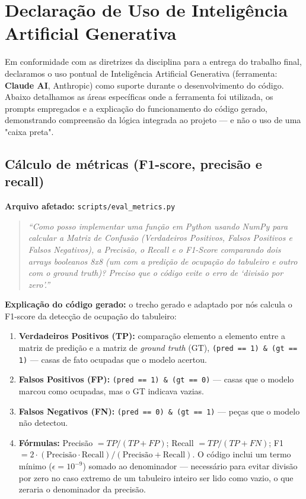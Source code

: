 \section{Declaração de Uso de Inteligência Artificial Generativa}
\label{sec:declaracao-ia}

Em conformidade com as diretrizes da disciplina para a entrega do trabalho final,
declaramos o uso pontual de Inteligência Artificial Generativa (ferramenta:
\textbf{Claude AI}, Anthropic) como suporte durante o desenvolvimento do código.
Abaixo detalhamos as áreas específicas onde a ferramenta foi utilizada, os prompts
empregados e a explicação do funcionamento do código gerado, demonstrando compreensão
da lógica integrada ao projeto --- e não o uso de uma "caixa preta".

\subsection{Cálculo de métricas (F1-score, precisão e recall)}
\label{sec:declaracao-ia-metricas}

\textbf{Arquivo afetado:} \texttt{scripts/eval\_metrics.py}

\begin{quote}
\itshape
``Como posso implementar uma função em Python usando NumPy para calcular a Matriz de
Confusão (Verdadeiros Positivos, Falsos Positivos e Falsos Negativos), a Precisão, o
Recall e o F1-Score comparando dois arrays booleanos 8x8 (um com a predição de
ocupação do tabuleiro e outro com o ground truth)? Preciso que o código evite o erro
de `divisão por zero'.''
\end{quote}

\textbf{Explicação do código gerado:} o trecho gerado e adaptado por nós calcula o
F1-score da detecção de ocupação do tabuleiro:
\begin{enumerate}[nosep]
  \item \textbf{Verdadeiros Positivos (TP):} comparação elemento a elemento entre a
        matriz de predição e a matriz de \textit{ground truth} (GT), \texttt{(pred == 1)
        \& (gt == 1)} --- casas de fato ocupadas que o modelo acertou.
  \item \textbf{Falsos Positivos (FP):} \texttt{(pred == 1) \& (gt == 0)} --- casas que o
        modelo marcou como ocupadas, mas o GT indicava vazias.
  \item \textbf{Falsos Negativos (FN):} \texttt{(pred == 0) \& (gt == 1)} --- peças que o
        modelo não detectou.
  \item \textbf{Fórmulas:} Precisão $= TP / (TP + FP)$; Recall $= TP / (TP + FN)$;
        F1 $= 2 \cdot (\text{Precisão} \cdot \text{Recall}) / (\text{Precisão} +
        \text{Recall})$. O código inclui um termo mínimo ($\epsilon = 10^{-9}$) somado
        ao denominador --- necessário para evitar divisão por zero no caso extremo de um
        tabuleiro inteiro ser lido como vazio, o que zeraria o denominador da precisão.
\end{enumerate}

